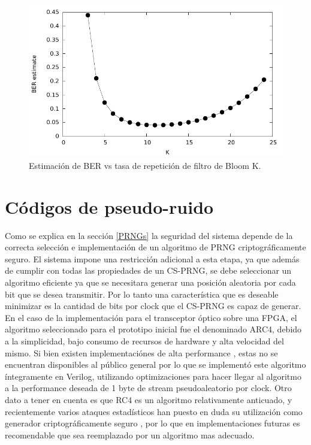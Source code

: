 \begin{figure}[!t]
  \centering
    \includegraphics[width=5in]{graphs/Kcalc}
    \caption{Estimación de BER vs tasa de repetición de filtro de Bloom K.}
    \label{BERvsK}
\end{figure}

\section{Códigos de pseudo-ruido}
Como se explica en la sección \ref{PRNGs} la seguridad del sistema depende de la correcta selección e implementación de un algoritmo de PRNG criptográficamente seguro.
El sistema impone una restricción adicional a esta etapa, ya que además de cumplir con todas las propiedades de un CS-PRNG, se debe seleccionar un algoritmo eficiente ya que se necesitara generar una posición aleatoria por cada bit que se desea transmitir. Por lo tanto una característica que es deseable minimizar es la cantidad de bits por clock que el CS-PRNG es capaz de generar.
En el caso de la implementación para el transceptor óptico sobre una FPGA, el algoritmo seleccionado para el prototipo inicial fue el denominado ARC4, debido a la simplicidad, bajo consumo de recursos de hardware y alta velocidad del mismo. Si bien existen implementaciónes de alta performance \cite{10.1109/TC.2012.19}, estas no se encuentran disponibles al público general por lo que se implementó este algoritmo íntegramente en Verilog, utilizando optimizaciones para hacer llegar al algoritmo a la performance deseada de 1 byte de stream pseudoaleatorio por clock. Otro dato a tener en cuenta es que RC4 es un algoritmo relativamente anticuado, y recientemente varios ataques estadísticos han puesto en duda su utilización como generador criptográficamente seguro \cite{Sepehrdad:2011:SAR:2008684.2008712}, por lo que en implementaciones futuras es recomendable que sea reemplazado por un algoritmo mas adecuado.

